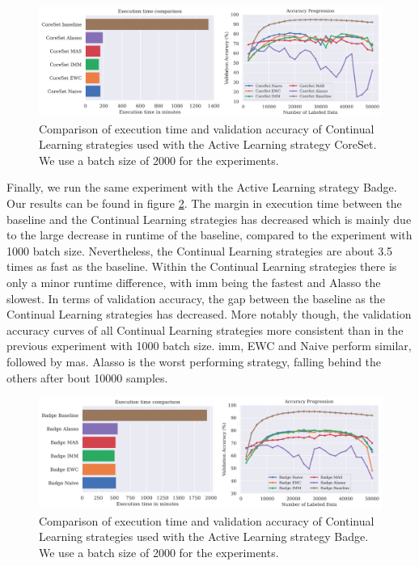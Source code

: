 \begin{figure}[h]
    \centering
    \includegraphics[width=\linewidth]{images/results_CAL/CoreSet_CAL_2000b.png}
    \caption[Continual Active Learning CoreSet 2000 batch size]{Comparison of execution time and validation accuracy of Continual Learning strategies used with the Active Learning strategy
    CoreSet. We use a batch size of 2000 for the experiments.}
    \label{fig:Evaluation:Results:CAL:CoreSet2000}
\end{figure}

Finally, we run the same experiment with the Active Learning strategy Badge. Our results can be found in figure \ref{fig:Evaluation:Results:CAL:Badge2000}. The margin in execution time between the baseline
and the Continual Learning strategies has decreased which is mainly due to the large decrease in runtime of the baseline, compared to the experiment with 1000 batch size. Nevertheless, the Continual
Learning strategies are about 3.5 times as fast as the baseline. Within the Continual Learning strategies there is only a minor runtime difference, with \gls{imm} being the fastest and Alasso the slowest. In terms of 
validation accuracy, the gap between the baseline as the Continual Learning strategies has decreased. More notably though, the validation accuracy curves of all Continual Learning strategies more consistent than
in the previous experiment with 1000 batch size. \gls{imm}, EWC and Naive perform similar, followed by \gls{mas}. Alasso is the worst performing strategy, falling behind the others after bout 10000 samples. \par

\begin{figure}[h]
    \centering
    \includegraphics[width=\linewidth]{images/results_CAL/Badge_CAL_2000b.png}
    \caption[Continual Active Learning Badge 2000 batch size]{Comparison of execution time and validation accuracy of Continual Learning strategies used with the Active Learning strategy
    Badge. We use a batch size of 2000 for the experiments.}
    \label{fig:Evaluation:Results:CAL:Badge2000}
\end{figure}

